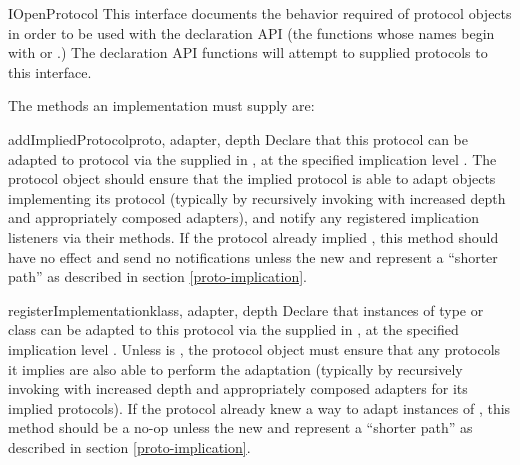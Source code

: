 \begin{verbatim%
}
\begin{verbatim%
}
\begin{verbatim%
}
\begin{verbatim%
}
\begin{verbatim%
}
\begin{verbatim%
}

\begin{classdesc*}{IOpenProtocol}
This interface documents the behavior required of protocol objects in order to
be used with the  declaration API (the functions whose names
begin with  or .)  The declaration API functions
will attempt to  supplied protocols to this interface.

The methods an  implementation must supply are:

\begin{methoddesc}{addImpliedProtocol}{proto, adapter, depth}
Declare that this protocol can be adapted to protocol  via the
 supplied in , at the specified implication
level .  The protocol object should ensure that the implied protocol
is able to adapt objects implementing its protocol (typically by recursively
invoking  with increased depth and
appropriately composed adapters), and notify any registered implication
listeners via their  methods.  If the protocol
already implied , this method should have no effect and send no
notifications unless the new  and  represent a
``shorter path'' as described in section \ref{proto-implication}.
\end{methoddesc}

\begin{methoddesc}{registerImplementation}{klass, adapter, depth}
Declare that instances of type or class  can be adapted to this
protocol via the  supplied in , at the
specified implication level .  Unless  is
, the protocol object must ensure that
any protocols it implies are also able to perform the adaptation (typically
by recursively invoking  with increased depth
and appropriately composed adapters for its implied protocols).  If the
protocol already knew a way to adapt instances of , this method
should be a no-op unless the new  and  represent a
``shorter path'' as described in section \ref{proto-implication}.
\end{methoddesc}


\end{classdesc*}
\end{verbatim%
}
\end{verbatim%
}
\end{verbatim%
}
\end{verbatim%
}
\end{verbatim%
}
\end{verbatim%
}
